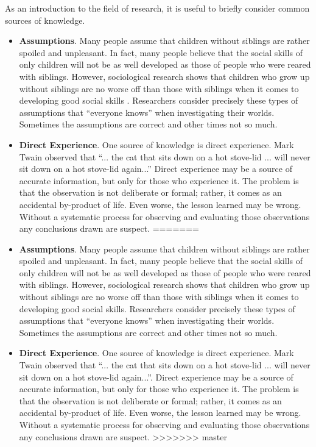 As an introduction to the field of research, it is useful to briefly consider common sources of knowledge. 

\begin{itemize}
<<<<<<< HEAD
	\item \textbf{Assumptions}. Many people assume that children without siblings are rather spoiled and unpleasant. In fact, many people believe that the social skills of only children will not be as well developed as those of people who were reared with siblings. However, sociological research shows that children who grow up without siblings are no worse off than those with siblings when it comes to developing good social skills \cite{bobbitt2013number}. Researchers consider precisely these types of assumptions that ``everyone knows'' when investigating their worlds. Sometimes the assumptions are correct and other times not so much.
	
	\item \textbf{Direct Experience}. One source of knowledge is direct experience. Mark Twain observed that ``... the cat that sits down on a hot stove-lid ... will never sit down on a hot stove-lid again...''\cite{twain2014following} Direct experience may be a source of accurate information, but only for those who experience it. The problem is that the observation is not deliberate or formal; rather, it comes as an accidental by-product of life. Even worse, the lesson learned may be wrong. Without a systematic process for observing and evaluating those observations any conclusions drawn are suspect.
=======
	\item \textbf{Assumptions}. Many people assume that children without siblings are rather spoiled and unpleasant. In fact, many people believe that the social skills of only children will not be as well developed as those of people who were reared with siblings. However, sociological research shows that children who grow up without siblings are no worse off than those with siblings when it comes to developing good social skills\cite{bobbitt2013number}. Researchers consider precisely these types of assumptions that ``everyone knows'' when investigating their worlds. Sometimes the assumptions are correct and other times not so much.
	
	\item \textbf{Direct Experience}. One source of knowledge is direct experience. Mark Twain observed that ``... the cat that sits down on a hot stove-lid ... will never sit down on a hot stove-lid again...''\cite{twain2014following}. Direct experience may be a source of accurate information, but only for those who experience it. The problem is that the observation is not deliberate or formal; rather, it comes as an accidental by-product of life. Even worse, the lesson learned may be wrong. Without a systematic process for observing and evaluating those observations any conclusions drawn are suspect.
>>>>>>> master


\end{itemize}
